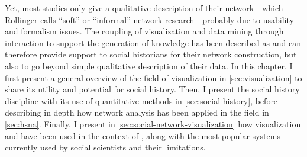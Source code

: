 Yet, most \hsna studies only give a qualitative description of their network---which Rollinger calls ``soft'' or ``informal'' network research\cite{rollingerProlegomenaProblemsPerspectives2020}---probably due to usability and formalism issues\cite{alkadi2022}.
The coupling of visualization and data mining through interaction to support the generation of knowledge has been described as \va and can therefore provide support to social historians for their network construction, but also to go beyond simple qualitative description of their data.
In this chapter, I first present a general overview of the field of visualization in \autoref{sec:visualization} to share its utility and potential for social history.
Then, I present the social history discipline with its use of quantitative methods in \autoref{sec:social-history}, before describing in depth how network analysis has been applied in the field in \autoref{sec:hsna}.
Finally, I present in \autoref{sec:social-network-visualization} how visualization and \va have been used in the context of \hsna, along with the most popular systems currently used by social scientists and their limitations.








